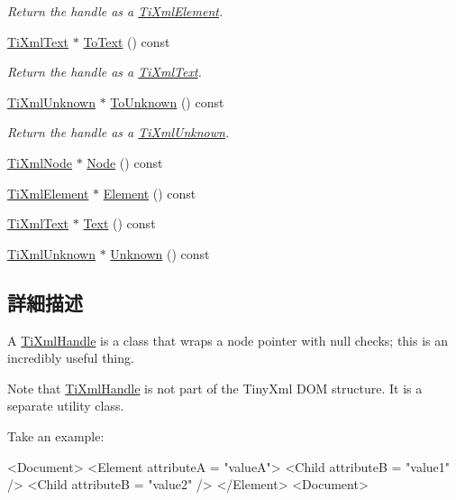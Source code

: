 \begin{DoxyCompactItemize}
\begin{DoxyCompactList}\small\item\em Return the handle as a \hyperlink{class_ti_xml_element}{Ti\+Xml\+Element}. \end{DoxyCompactList}\item 
\hyperlink{class_ti_xml_text}{Ti\+Xml\+Text} $\ast$ \hyperlink{class_ti_xml_handle_a4ac53a652296203a5b5e13854d923586}{To\+Text} () const 
\begin{DoxyCompactList}\small\item\em Return the handle as a \hyperlink{class_ti_xml_text}{Ti\+Xml\+Text}. \end{DoxyCompactList}\item 
\hyperlink{class_ti_xml_unknown}{Ti\+Xml\+Unknown} $\ast$ \hyperlink{class_ti_xml_handle_a1381c17507a130767b1e23afc93b3674}{To\+Unknown} () const 
\begin{DoxyCompactList}\small\item\em Return the handle as a \hyperlink{class_ti_xml_unknown}{Ti\+Xml\+Unknown}. \end{DoxyCompactList}\item 
\hyperlink{class_ti_xml_node}{Ti\+Xml\+Node} $\ast$ \hyperlink{class_ti_xml_handle_ab44b723a8dc9af72838a303c079d0376}{Node} () const 
\item 
\hyperlink{class_ti_xml_element}{Ti\+Xml\+Element} $\ast$ \hyperlink{class_ti_xml_handle_acb5fe8388a526289ea65e817a51e05e7}{Element} () const 
\item 
\hyperlink{class_ti_xml_text}{Ti\+Xml\+Text} $\ast$ \hyperlink{class_ti_xml_handle_a9fc739c8a18d160006f82572fc143d13}{Text} () const 
\item 
\hyperlink{class_ti_xml_unknown}{Ti\+Xml\+Unknown} $\ast$ \hyperlink{class_ti_xml_handle_a49675b74357ba2aae124657a9a1ef465}{Unknown} () const 
\end{DoxyCompactItemize}


\subsection{詳細描述}
A \hyperlink{class_ti_xml_handle}{Ti\+Xml\+Handle} is a class that wraps a node pointer with null checks; this is an incredibly useful thing. 

Note that \hyperlink{class_ti_xml_handle}{Ti\+Xml\+Handle} is not part of the Tiny\+Xml D\+OM structure. It is a separate utility class.

Take an example\+: \begin{DoxyVerb}<Document>
    <Element attributeA = "valueA">
        <Child attributeB = "value1" />
        <Child attributeB = "value2" />
    </Element>
<Document>
\end{DoxyVerb}


